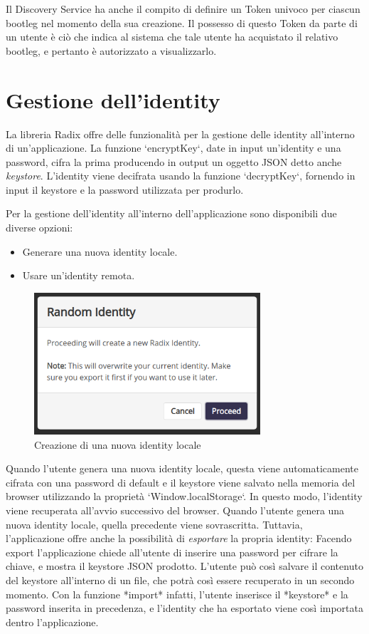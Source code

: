 Il Discovery Service ha anche il compito di definire un Token univoco per ciascun bootleg nel momento della sua creazione. Il possesso di questo Token da parte di un utente è ciò che indica al sistema che tale utente ha acquistato il relativo bootleg, e pertanto è autorizzato a visualizzarlo.

\section{Gestione dell'identity}

La libreria Radix offre delle funzionalità per la gestione delle identity all'interno di un'applicazione. La funzione `encryptKey`, date in input un'identity e una password, cifra la prima producendo in output un oggetto JSON detto anche \textit{keystore}. L'identity viene decifrata usando la funzione `decryptKey`, fornendo in input il keystore e la password utilizzata per produrlo.

Per la gestione dell'identity all'interno dell'applicazione sono disponibili due diverse opzioni:
\begin{itemize}
    \item Generare una nuova identity locale.
    \item Usare un'identity remota.
\end{itemize}

\begin{figure}[H]
  \centering
  \includegraphics[width=0.75\textwidth]{images/application/create_random.png}
  \caption{Creazione di una nuova identity locale}
  \label{fig:trex}
\end{figure}

Quando l'utente genera una nuova identity locale, questa viene automaticamente cifrata con una password di default e il keystore viene salvato nella memoria del browser utilizzando la proprietà `Window.localStorage`. In questo modo, l'identity viene recuperata all'avvio successivo del browser. Quando l'utente genera una nuova identity locale, quella precedente viene sovrascritta. Tuttavia, l'applicazione offre anche la possibilità di \textit{esportare} la propria identity: Facendo export l'applicazione chiede all'utente di inserire una password per cifrare la chiave, e mostra il keystore JSON prodotto. L'utente può così salvare il contenuto del keystore all'interno di un file, che potrà così essere recuperato in un secondo momento. Con la funzione *import* infatti, l'utente inserisce il *keystore* e la password inserita in precedenza, e l'identity che ha esportato viene così importata dentro l'applicazione.

